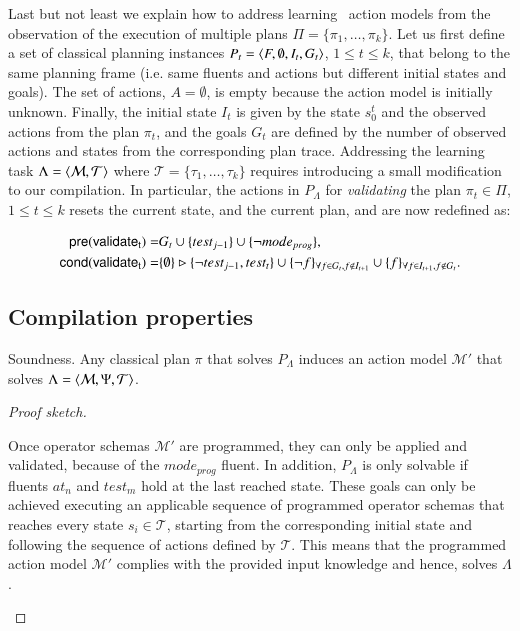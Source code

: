 Last but not least we explain how to address learning \strips\ action models from the observation of the execution of multiple plans $\Pi=\{\pi_1,\ldots,\pi_k\}$. Let us first define a set of classical planning instances $P_t={\langle F,\emptyset,I_t,G_t \rangle}$, {\tt\small $1\leq t\leq k$}, that belong to the same planning frame (i.e. same fluents and actions but different initial states and goals). The set of actions, $A=\emptyset$, is empty because the action model is initially unknown. Finally, the initial state $I_t$ is given by the state $s_0^t$ and the observed actions from the plan $\pi_t$, and the goals $G_t$ are defined by the number of observed actions and states from the corresponding plan trace. Addressing the learning task $\Lambda={\langle \mathcal{M},\mathcal{T} \rangle}$ where $\mathcal{T}=\{\tau_1,\ldots,\tau_k\}$ requires introducing a small modification to our compilation. In particular, the actions in $P_{\Lambda}$ for {\em validating} the plan $\pi_t\in\Pi$, {\tt\small $1\leq t\leq k$} resets the current state, and the current plan, and are now redefined as:
\begin{small}
\begin{align*}
\hspace*{7pt}\mathsf{pre}(\mathsf{validate_{t}})=&G_t\cup\{test_{j-1}\}\cup \{\neg mode_{prog}\},\\
\mathsf{cond}(\mathsf{validate_{t}})=&\{\emptyset\}\rhd\{\neg test_{j-1},test_t\} \cup \{\neg f\}_{\forall f\in G_t, f \notin I_{t+1}}\cup \{f\}_{\forall f\in I_{t+1}, f \notin G_t}.
\end{align*}
\end{small}


\subsection{Compilation properties}

\begin{mylemma}
Soundness. Any classical plan $\pi$ that solves $P_{\Lambda}$ induces an action model $\mathcal{M}'$ that solves $\Lambda={\langle \mathcal{M},\Psi,\mathcal{T} \rangle}$.
\end{mylemma}

\begin{proof}[Proof sketch]
\begin{small}
Once operator schemas $\mathcal{M}'$ are programmed, they can only be applied and validated, because of the $mode_{prog}$ fluent. In addition, $P_{\Lambda}$ is only solvable if fluents {\tt\small $at_n$} and {\tt\small $test_m$} hold at the last reached state. These goals can only be achieved executing an applicable sequence of programmed operator schemas that reaches every state $s_i\in\mathcal{T}$, starting from the corresponding initial state and following the sequence of actions defined by $\mathcal{T}$. This means that the programmed action model $\mathcal{M}'$ complies with the provided input knowledge and hence, solves $\Lambda$.
\end{small}
\end{proof}


